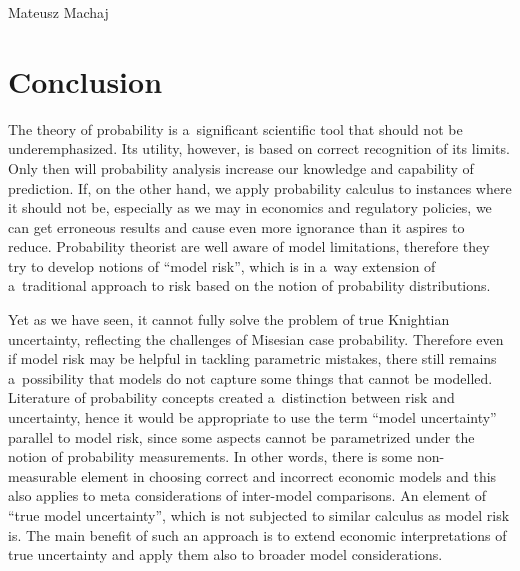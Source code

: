 \begin{artengenv}{Mateusz Machaj}
\section{Conclusion}

The theory of probability is a~significant scientific tool that should not be underemphasized. Its utility, however, is based on correct recognition of its limits. Only then will probability analysis increase our knowledge and capability of prediction. If, on the other hand, we apply probability calculus to instances where it should not be, especially as we may in economics and regulatory policies, we can get erroneous results and cause even more ignorance than it aspires to reduce. Probability theorist are well aware of model limitations, therefore they try to develop notions of ``model risk'', which is in a~way extension of a~traditional approach to risk based on the notion of probability distributions.



Yet as we have seen, it cannot fully solve the problem of true Knightian uncertainty, reflecting the challenges of Misesian case probability. Therefore even if model risk may be helpful in tackling parametric mistakes, there still remains a~possibility that models do not capture some things that cannot be modelled. Literature of probability concepts created a~distinction between risk and uncertainty, hence it would be appropriate to use the term ``model uncertainty'' parallel to model risk, since some aspects cannot be parametrized under the notion of probability measurements. In other words, there is some non-measurable element in choosing correct and incorrect economic models and this also applies to meta considerations of inter-model comparisons. An element of ``true model uncertainty'', which is not subjected to similar calculus as model risk is. The main benefit of such an approach is to extend economic interpretations of true uncertainty and apply them also to broader model considerations.







\end{artengenv}

